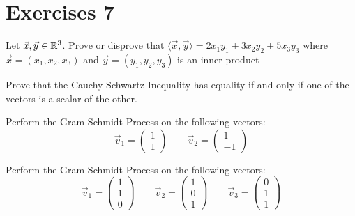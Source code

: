 \section{Exercises 7}
\begin{exercise}
    Let $\vec{x},\vec{y}\in\mathbb{R}^3$. Prove or disprove that $\langle\vec{x},\vec{y}\rangle=2x_1y_1+3x_2y_2+5x_3y_3$ where $\vec{x}=(x_1, x_2,x_3)$ and $\vec{y}=(y_1,y_2,y_3)$ is an inner product
\end{exercise}
\begin{exercise}
    Prove that the Cauchy-Schwartz Inequality has equality if and only if one of the vectors is a scalar of the other.
\end{exercise}
\begin{exercise}
    Perform the Gram-Schmidt Process on the following vectors:
    $$\vec{v}_1=\begin{pmatrix}
        1 \\ 1
    \end{pmatrix}\quad\quad\vec{v}_2=\begin{pmatrix}
        1 \\ -1
    \end{pmatrix}$$
\end{exercise}
\begin{exercise}
    Perform the Gram-Schmidt Process on the following vectors:
    $$\vec{v}_1=\begin{pmatrix}
        1 \\ 1 \\ 0
    \end{pmatrix}\quad\quad\vec{v}_2=\begin{pmatrix}
        1 \\ 0 \\ 1
    \end{pmatrix}\quad\quad\vec{v}_3=\begin{pmatrix}
        0 \\ 1 \\ 1
    \end{pmatrix}$$
\end{exercise}